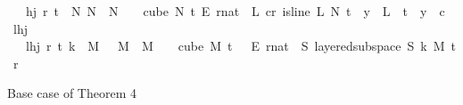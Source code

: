 \begin{isabellebody}
\ \ \ {\isachardoublequoteopen}hj\ r\ t\ {\isasymequiv}\ {\isacharparenleft}{\kern0pt}{\isasymexists}N{\isachargreater}{\kern0pt}{}{\isachardot}{\kern0pt}\ {\isasymforall}N{\isacharprime}{\kern0pt}\ {\isasymge}\ N{\isachardot}{\kern0pt}\ {\isasymforall}{\isasymchi}{\isachardot}{\kern0pt}\ {\isasymchi}\ {\isasymin}\ {\isacharparenleft}{\kern0pt}cube\ N{\isacharprime}{\kern0pt}\ t{\isacharparenright}{\kern0pt}\ {\isasymrightarrow}\isactrlsub E\ {\isacharbraceleft}{\kern0pt}{\isachardot}{\kern0pt}{\isachardot}{\kern0pt}{\isacharless}{\kern0pt}r{\isacharcolon}{\kern0pt}{\isacharcolon}{\kern0pt}nat{\isacharbraceright}{\kern0pt}\ {\isasymlongrightarrow}\ {\isacharparenleft}{\kern0pt}{\isasymexists}L{\isachardot}{\kern0pt}\ {\isasymexists}c{\isacharless}{\kern0pt}r{\isachardot}{\kern0pt}\ is{\isacharunderscore}{\kern0pt}line\ L\ N{\isacharprime}{\kern0pt}\ t\ {\isasymand}\ {\isacharparenleft}{\kern0pt}{\isasymforall}y\ {\isasymin}\ L\ {\isacharbackquote}{\kern0pt}\ {\isacharbraceleft}{\kern0pt}{\isachardot}{\kern0pt}{\isachardot}{\kern0pt}{\isacharless}{\kern0pt}t{\isacharbraceright}{\kern0pt}{\isachardot}{\kern0pt}\ {\isasymchi}\ y\ {\isacharequal}{\kern0pt}\ c{\isacharparenright}{\kern0pt}{\isacharparenright}{\kern0pt}{\isacharparenright}{\kern0pt}{\isachardoublequoteclose}\isanewline
\isanewline
{}\isamarkupfalse%
\ lhj\isanewline
\ \ \ {\isachardoublequoteopen}lhj\ r\ t\ k\ {\isasymequiv}\ {\isacharparenleft}{\kern0pt}{\isasymexists}M\ {\isachargreater}{\kern0pt}\ {}{\isachardot}{\kern0pt}\ {\isasymforall}M{\isacharprime}{\kern0pt}\ {\isasymge}\ M{\isachardot}{\kern0pt}\ {\isasymforall}{\isasymchi}{\isachardot}{\kern0pt}\ {\isasymchi}\ {\isasymin}\ {\isacharparenleft}{\kern0pt}cube\ M{\isacharprime}{\kern0pt}\ {\isacharparenleft}{\kern0pt}t\ {\isacharplus}{\kern0pt}\ {}{\isacharparenright}{\kern0pt}{\isacharparenright}{\kern0pt}\ {\isasymrightarrow}\isactrlsub E\ {\isacharbraceleft}{\kern0pt}{\isachardot}{\kern0pt}{\isachardot}{\kern0pt}{\isacharless}{\kern0pt}r{\isacharcolon}{\kern0pt}{\isacharcolon}{\kern0pt}nat{\isacharbraceright}{\kern0pt}\ {\isasymlongrightarrow}\ {\isacharparenleft}{\kern0pt}{\isasymexists}S{\isachardot}{\kern0pt}\ layered{\isacharunderscore}{\kern0pt}subspace\ S\ k\ M{\isacharprime}{\kern0pt}\ t\ r\ {\isasymchi}{\isacharparenright}{\kern0pt}{\isacharparenright}{\kern0pt}{\isachardoublequoteclose}%
\begin{isamarkuptext}%
Base case of Theorem 4%
\end{isamarkuptext}\isamarkuptrue%

\end{isabellebody}

